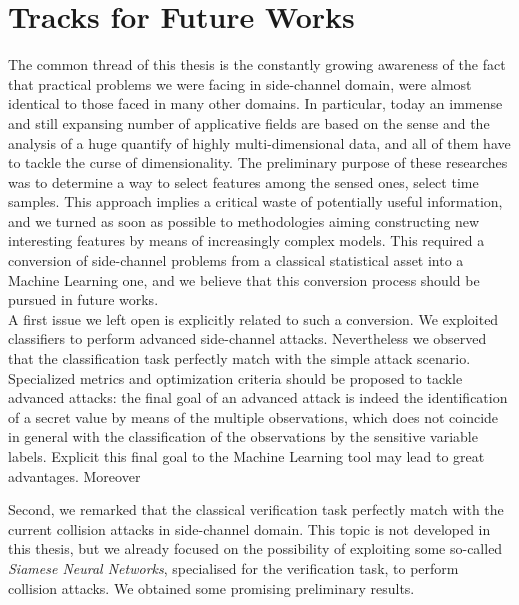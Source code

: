 \section{Tracks for Future Works}

The common thread of this thesis is the constantly growing awareness of the fact that practical problems we were facing in side-channel domain, were almost identical to those faced in many other domains. In particular, today an immense and still expansing number of applicative fields are based on the sense and the analysis of a huge quantify of highly multi-dimensional data, and all of them have to tackle the curse of dimensionality. The preliminary purpose of these researches was to determine a way to select features among the sensed ones, \ie select time samples. This approach implies a critical waste of potentially useful information, and we turned as soon as possible to methodologies aiming constructing new interesting features by means of increasingly complex models. This required a conversion of side-channel problems from a classical statistical asset into a Machine Learning one, and we believe that this conversion process should be pursued in future works.\\

A first issue we left open is explicitly related to such a conversion. We exploited classifiers to perform advanced side-channel attacks. Nevertheless we observed that the classification task perfectly match with the simple attack scenario. Specialized metrics and optimization criteria should be proposed to tackle advanced attacks: the final goal of an advanced attack is indeed the identification of a secret value by means of the multiple observations, which does not coincide in general with the classification of the observations by the sensitive variable labels. Explicit this final goal to the Machine Learning tool may lead to great advantages. Moreover 


Second, we remarked that the classical verification task perfectly match with the current collision attacks in side-channel domain. This topic is not developed in this thesis, but we already focused on the possibility of exploiting some so-called \emph{Siamese Neural Networks}, specialised for the verification task, to perform collision attacks. We obtained some promising preliminary results. \\

